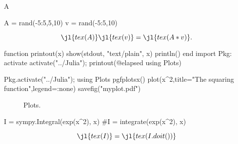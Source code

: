 \documentclass{article}
\newcommand\jltex[1]{\jl{tex(#1)}}
\begin{document}
A

\begin{jlcode}
	A = rand(-5:5,5,10)
	v = rand(-5:5,10)
\end{jlcode}

\[
	\jltex{A} \jltex{v} = \jltex{A*v}.
\]

\begin{juliacode}
	function printout(x)
	show(stdout, "text/plain", x)
	println()
	end
	import Pkg: activate
	activate("../Julia");
	printout(@elapsed using Plots)
\end{juliacode}

\begin{jlcode}
	Pkg.activate("../Julia");
	using Plots
	pgfplotsx()
	plot(x^2,title="The squaring function",legend=:none)
	savefig("myplot.pdf")
\end{jlcode}

\begin{figure}[ht!]
	\centering
	\caption{Plots.}
\end{figure}

\begin{jlcode}
	I = sympy.Integral(exp(x^2), x)
	#I = integrate(exp(x^2), x)
\end{jlcode}

\[
	\jltex{I}=\jltex{I.doit()}
\]

\end{document}
